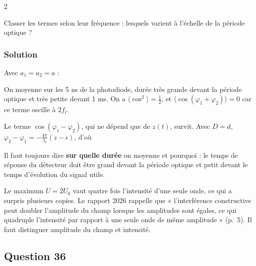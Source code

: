 \documentclass[11pt,a4paper]{article}
\newcommand{\equationajustee}[1]{%
  \sbox{\boiteequation}{$\displaystyle #1$}%
  \ifdim\wd\boiteequation>\linewidth
    \[\resizebox{\linewidth}{!}{\usebox{\boiteequation}}\]%
  \else
    \[#1\]%
  \fi}
\begin{document}
\begin{indication}{2}

Classer les termes selon leur fréquence : lesquels varient à l'échelle de la période optique ?

\end{indication}

\hypertarget{solution-34}{%
\subsubsection{Solution}\label{solution-34}}

Avec \(a_1=a_2=a\) :

\equationajustee{(s_1+s_2)^2=a^2\left[\cos^2\varphi_1+\cos^2\varphi_2+\cos(\varphi_1+\varphi_2)+\cos(\varphi_1-\varphi_2)\right].}

On moyenne sur les 5 ns de la photodiode, durée très grande devant la période optique et très petite devant 1 ms. On a \(\langle\cos^2\rangle=\frac12\), et \(\langle\cos(\varphi_1+\varphi_2)\rangle=0\) car ce terme oscille à \(2f_l\).

Le terme \(\cos(\varphi_1-\varphi_2)\), qui ne dépend que de \(z(t)\), survit. Avec \(D=d\), \(\varphi_2-\varphi_1=-\frac{4\pi}{\lambda_l}(z-\epsilon)\), d'où

\equationajustee{\boxed{U(t)=U_0\left(1+\cos\left(4\pi\frac{z(t)-\epsilon}{\lambda_l}\right)\right)}}

\begin{methode}

Il faut toujours dire \textbf{sur quelle durée} on moyenne et pourquoi : le temps de réponse du détecteur doit être grand devant la période optique et petit devant le temps d'évolution du signal utile.

\end{methode}

\begin{jury}

Le maximum \(U=2U_0\) vaut quatre fois l'intensité d'une seule onde, ce qui a surpris plusieurs copies. Le rapport 2026 rappelle que « l'interférence constructive peut doubler l'amplitude du champ lorsque les amplitudes sont égales, ce qui quadruple l'intensité par rapport à une seule onde de même amplitude » (p.~5). Il faut distinguer amplitude du champ et intensité.

\end{jury}

\hypertarget{question-36}{%
\subsection{Question 36}\label{question-36}}
\end{document}
